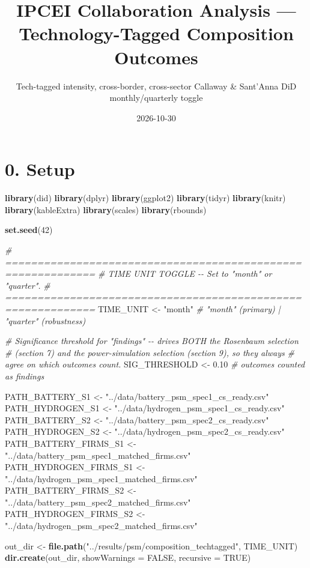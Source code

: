 \documentclass[
]{article}
\title{IPCEI Collaboration Analysis --- Technology-Tagged Composition
Outcomes}
\subtitle{Tech-tagged intensity, cross-border, cross-sector \textbar{}
Callaway \& Sant'Anna DiD \textbar{} monthly/quarterly toggle}
\author{}
\date{\vspace{-2.5em}2026-10-30}
\newenvironment{Shaded}{\begin{snugshade}}{\end{snugshade}}
\newcommand{\AttributeTok}[1]{\textcolor[rgb]{0.13,0.29,0.53}{#1}}
\newcommand{\CommentTok}[1]{\textcolor[rgb]{0.56,0.35,0.01}{\textit{#1}}}
\newcommand{\ConstantTok}[1]{\textcolor[rgb]{0.56,0.35,0.01}{#1}}
\newcommand{\DecValTok}[1]{\textcolor[rgb]{0.00,0.00,0.81}{#1}}
\newcommand{\FloatTok}[1]{\textcolor[rgb]{0.00,0.00,0.81}{#1}}
\newcommand{\FunctionTok}[1]{\textcolor[rgb]{0.13,0.29,0.53}{\textbf{#1}}}
\newcommand{\NormalTok}[1]{#1}
\newcommand{\OtherTok}[1]{\textcolor[rgb]{0.56,0.35,0.01}{#1}}
\newcommand{\StringTok}[1]{\textcolor[rgb]{0.31,0.60,0.02}{#1}}
\begin{document}
\maketitle

{
\setcounter{tocdepth}{3}
\tableofcontents
}
\section{0. Setup}\label{setup}

\begin{Shaded}
\begin{Highlighting}[]
\FunctionTok{library}\NormalTok{(did)}
\FunctionTok{library}\NormalTok{(dplyr)}
\FunctionTok{library}\NormalTok{(ggplot2)}
\FunctionTok{library}\NormalTok{(tidyr)}
\FunctionTok{library}\NormalTok{(knitr)}
\FunctionTok{library}\NormalTok{(kableExtra)}
\FunctionTok{library}\NormalTok{(scales)}
\FunctionTok{library}\NormalTok{(rbounds)}

\FunctionTok{set.seed}\NormalTok{(}\DecValTok{42}\NormalTok{)}

\CommentTok{\# ============================================================}
\CommentTok{\# TIME UNIT TOGGLE  {-}{-}  Set to "month" or "quarter".}
\CommentTok{\# ============================================================}
\NormalTok{TIME\_UNIT }\OtherTok{\textless{}{-}} \StringTok{"month"}   \CommentTok{\# "month" (primary) | "quarter" (robustness)}

\CommentTok{\# Significance threshold for "findings" {-}{-} drives BOTH the Rosenbaum selection}
\CommentTok{\# (section 7) and the power{-}simulation selection (section 9), so they always}
\CommentTok{\# agree on which outcomes count.}
\NormalTok{SIG\_THRESHOLD }\OtherTok{\textless{}{-}} \FloatTok{0.10}  \CommentTok{\# outcomes counted as findings}

\NormalTok{PATH\_BATTERY\_S1        }\OtherTok{\textless{}{-}} \StringTok{"../data/battery\_psm\_spec1\_cs\_ready.csv"}
\NormalTok{PATH\_HYDROGEN\_S1       }\OtherTok{\textless{}{-}} \StringTok{"../data/hydrogen\_psm\_spec1\_cs\_ready.csv"}
\NormalTok{PATH\_BATTERY\_S2        }\OtherTok{\textless{}{-}} \StringTok{"../data/battery\_psm\_spec2\_cs\_ready.csv"}
\NormalTok{PATH\_HYDROGEN\_S2       }\OtherTok{\textless{}{-}} \StringTok{"../data/hydrogen\_psm\_spec2\_cs\_ready.csv"}
\NormalTok{PATH\_BATTERY\_FIRMS\_S1  }\OtherTok{\textless{}{-}} \StringTok{"../data/battery\_psm\_spec1\_matched\_firms.csv"}
\NormalTok{PATH\_HYDROGEN\_FIRMS\_S1 }\OtherTok{\textless{}{-}} \StringTok{"../data/hydrogen\_psm\_spec1\_matched\_firms.csv"}
\NormalTok{PATH\_BATTERY\_FIRMS\_S2  }\OtherTok{\textless{}{-}} \StringTok{"../data/battery\_psm\_spec2\_matched\_firms.csv"}
\NormalTok{PATH\_HYDROGEN\_FIRMS\_S2 }\OtherTok{\textless{}{-}} \StringTok{"../data/hydrogen\_psm\_spec2\_matched\_firms.csv"}

\NormalTok{out\_dir }\OtherTok{\textless{}{-}} \FunctionTok{file.path}\NormalTok{(}\StringTok{"../results/psm/composition\_techtagged"}\NormalTok{, TIME\_UNIT)}
\FunctionTok{dir.create}\NormalTok{(out\_dir, }\AttributeTok{showWarnings =} \ConstantTok{FALSE}\NormalTok{, }\AttributeTok{recursive =} \ConstantTok{TRUE}\NormalTok{)}
\end{Highlighting}
\end{Shaded}
\end{document}
